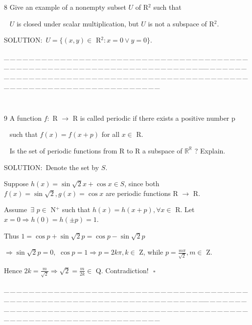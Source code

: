 \documentclass[a4paper, 11pt, UTF8]{article}
\begin{document}
\begin{large}
{\timesbf\Large 8} {\timessl\Large 
Give an example of a nonempty subset $U$ of {\timesbf R}$^2$ such that}\par\,\,\,
{\timessl\Large $U$ is closed under scalar multiplication, but $U$ is not a subspace of {\timesbf R}$^2$.
}\par
{\timesbf S\footnotesize{OLUTION:}}\,\,\,$U=\{(x,y)\in$ {\timesbf R}$^2:x=0\vee y=0\}.$\par
{\tiny \_\,\_\,\_\,\_\,\_\,\_\,\_\,\_\,\_\,\_\,\_\,\_\,\_\,\_\,\_\,\_\,\_\,\_\,\_\,\_\,\_\,\_\,\_\,\_\,\_\,\_\,\_\,\_\,\_\,\_\,\_\,\_\,\_\,\_\,\_\,\_\,\_\,\_\,\_\,\_\,\_\,\_\,\_\,\_\,\_\,\_\,\_\,\_\,\_\,\_\,\_\,\_\,\_\,\_\,\_\,\_\,\_\,\_\,\_\,\_\,\_\,\_\,\_\,\_\,\_\,\_\,\_\,\_\,\_\,\_\,\_\_\,\_\,\_\,\_\,\_\,\_\,\_\,\_\,\_\,\_\,\_\,\_\,\_\,\_\,\_\,\_\,\_\,\_\,\_\,\_\,\_\,\_\,\_\,\_\,\_\,\_\,\_\,\_\,\_\,\_\,\_\,\_\,\_\,\_\,\_\,\_\,\_\,\_\,\_\,\_\,\_\,\_\,\_\,\_\,\_\,\_\,\_\,\_\,\_\,\_\,\_\,\_\,\_\,\_\,\_\,\_\,\_\,\_\,\_\,\_\,\_\,\_\,\_\,\_\,\_\,\_\,\_\,\_\,\_\,\_\,\_}{\tiny\,\par}

{\timesbf\Large 9} {\timessl\Large 
A function $f:$ {\timesbf R} $\rightarrow$ {\timesbf R} is called periodic if there exists a positive number p}\par\,\,\,
{\timessl\Large such that $f(x)=f(x+p)$ for all $x\in$ {\timesbf R}.}\par\,\,\,
{\timessl\Large Is the set of periodic functions from {\timesbf R} to {\timesbf R} a subspace of $\mathbb{R}^\mathbb{R}$ ? Explain.}\par
{\timesbf S\footnotesize{OLUTION:}}\,\,\,Denote the set by $S$.\par\quad
Suppose $h(x)=\sin\sqrt{2}x+\cos x\in S$, since both $f(x)=\sin\sqrt{2},g(x)=\cos x$ are periodic functions {\timesbf R} $\rightarrow$ {\timesbf R}.\par\quad
Assume $\,\exists\,\,p\in$ {\timesbf N}$^+$ such that $h(x)=h(x+p),\forall x\in$ {\timesbf R}. Let $x=0\Rightarrow h(0)=h(\pm p)=1$.\par\quad
Thus $1=\cos p+\sin\sqrt{2}p=\cos p-\sin\sqrt{2}p$\par\quad
$\Rightarrow\sin\sqrt{2}p=0,\,\,\cos p=1\Rightarrow p=2k\pi,k\in$ {\timesbf Z}, while $p=\displaystyle\frac{m\pi}{\sqrt{2}},m\in$ {\timesbf Z}.\par\quad
Hence $2k=\displaystyle\frac{m}{\sqrt{2}}\Rightarrow \sqrt{2}=\displaystyle\frac{m}{2k}\in$ {\timesbf Q}. Contradiction!$\,\,\,\,\square$\par
{\tiny \_\,\_\,\_\,\_\,\_\,\_\,\_\,\_\,\_\,\_\,\_\,\_\,\_\,\_\,\_\,\_\,\_\,\_\,\_\,\_\,\_\,\_\,\_\,\_\,\_\,\_\,\_\,\_\,\_\,\_\,\_\,\_\,\_\,\_\,\_\,\_\,\_\,\_\,\_\,\_\,\_\,\_\,\_\,\_\,\_\,\_\,\_\,\_\,\_\,\_\,\_\,\_\,\_\,\_\,\_\,\_\,\_\,\_\,\_\,\_\,\_\,\_\,\_\,\_\,\_\,\_\,\_\,\_\,\_\,\_\,\_\_\,\_\,\_\,\_\,\_\,\_\,\_\,\_\,\_\,\_\,\_\,\_\,\_\,\_\,\_\,\_\,\_\,\_\,\_\,\_\,\_\,\_\,\_\,\_\,\_\,\_\,\_\,\_\,\_\,\_\,\_\,\_\,\_\,\_\,\_\,\_\,\_\,\_\,\_\,\_\,\_\,\_\,\_\,\_\,\_\,\_\,\_\,\_\,\_\,\_\,\_\,\_\,\_\,\_\,\_\,\_\,\_\,\_\,\_\,\_\,\_\,\_\,\_\,\_\,\_\,\_\,\_\,\_\,\_\,\_\,\_}\par{\tiny\,\par}


\end{large}
\end{document}
